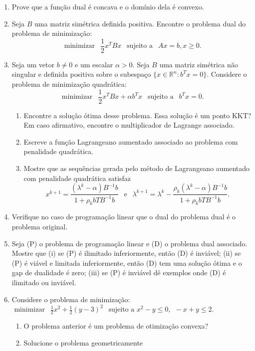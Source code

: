 \documentclass[a4paper,latin]{article}
\begin{document}
    \begin{enumerate}
    \item Prove que a função dual é concava e o domínio dela é convexo.	
    \item Seja $B$ uma matriz simétrica definida positiva. Encontre
    o problema dual do problema de minimização:
       $$ \text{ minimizar } \ \ \frac{1}{2} x^{T}Bx \ \ \text{ sujeito a } \ \ Ax=b, x \geq 0. $$ 
    \item Seja  um vetor $b \neq 0$ e um escalar $\alpha >0$. Seja $B$ uma matriz simétrica não singular e definida positiva
    sobre o subespaço $\{x \in \mathbb{R}^{n}:b^{T}x=0 \}$. 
    Considere o problema de minimização quadrática:
    $$ \text{ minimizar } \ \ \frac{1}{2} x^{T}Bx+ \alpha b^{T}x  \ \ \text{ sujeito a } \ \ b^{T}x=0. $$    
        \begin{enumerate}
        	\item Encontre a solução ótima desse problema.
        	Essa solução é um ponto KKT? Em caso afirmativo, encontre
        	o multiplicador de Lagrange associado.
        	\item Escreve a função Lagrangeano aumentado associado ao problema com penalidade quadrática.
        	\item Mostre que as sequências gerada pelo método de Lagrangeano aumentado com penalidade quadrática satisfaz 
        	$$
        x^{k+1}=\frac{(\lambda^k-\alpha)B^{-1}b}{1+\rho_kb{T}B^{-1}b}
            \  \ \text{ e } \ \ 
        \lambda^{k+1}=\lambda^k-\frac{\rho_k (\lambda^k-\alpha)B^{-1}b}{1+\rho_kb{T}B^{-1}b}. $$ 
        \end{enumerate}
    \item Verifique no caso de programação linear que o dual do problema dual é o problema original.
    \item Seja (P) o problema de programação linear e (D) o problema dual associado. Mostre que (i) se (P) é ilimitado inferiormente, então (D) é inviável; (ii) se (P) é viável e limitada inferiormente, então (D) tem uma solução ótima e o gap de dualidade é zero; (iii) se (P) é inviável dê exemplos onde (D) é ilimitado ou inviável.
    \item Considere o problema de minimização:  
    $ \text{ minimizar } \ \ \frac{1}{2}x^2+\frac{1}{2}(y-3)^2 \ \ \text{ sujeito a  } x^2-y \leq 0, \ \ -x+y \leq 2 $. 
    \begin{enumerate}
    	\item O problema anterior é um problema de otimização convexa?
    	\item Solucione o problema geometricamente 

\end{enumerate}
\end{enumerate}
\end{document}
